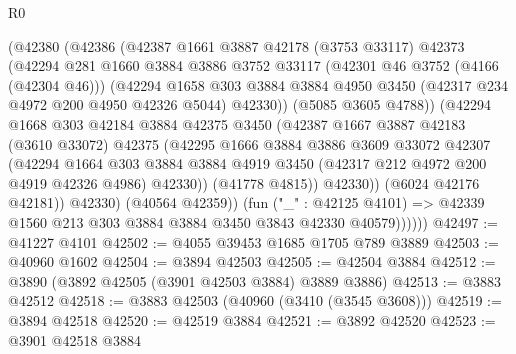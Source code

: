 \begin{lexlean}{R0}
\begin{coremodule}
                  (@42380
                    (@42386
                      (@42387
                        @1661
                        @3887
                        @42178
                        (@3753 @33117)
                        @42373
                        (@42294
                          @281
                          @1660
                          @3884
                          @3886
                          @3752
                          @33117
                          (@42301 @46 @3752 (@4166 (@42304 @46)))
                          (@42294
                            @1658
                            @303
                            @3884
                            @3884
                            @4950
                            @3450
                            (@42317 @234 @4972 @200 @4950 @42326 @5044)
                            @42330))
                        (@5085 @3605 @4788))
                      (@42294
                        @1668
                        @303
                        @42184
                        @3884
                        @42375
                        @3450
                        (@42387
                          @1667
                          @3887
                          @42183
                          (@3610 @33072)
                          @42375
                          (@42295
                            @1666
                            @3884
                            @3886
                            @3609
                            @33072
                            @42307
                            (@42294
                              @1664
                              @303
                              @3884
                              @3884
                              @4919
                              @3450
                              (@42317 @212 @4972 @200 @4919 @42326 @4986)
                              @42330))
                          (@41778 @4815))
                        @42330))
                    (@6024 @42176 @42181))
                  @42330)
                (@40564 @42359))
              (fun ("_" : @42125 @4101) =>
              @42339 @1560 @213 @303 @3884 @3884 @3450 @3843 @42330 @40579))))))
@42497 := @41227 @4101
@42502 := @4055 @39453 @1685 @1705 @789 @3889
@42503 := @40960 @1602
@42504 := @3894 @42503
@42505 := @42504 @3884
@42512 := @3890 (@3892 @42505 (@3901 @42503 @3884) @3889 @3886)
@42513 := @3883 @42512
@42518 := @3883 @42503 (@40960 (@3410 (@3545 @3608)))
@42519 := @3894 @42518
@42520 := @42519 @3884
@42521 := @3892 @42520
@42523 := @3901 @42518 @3884

\end{coremodule}
\end{lexlean}
